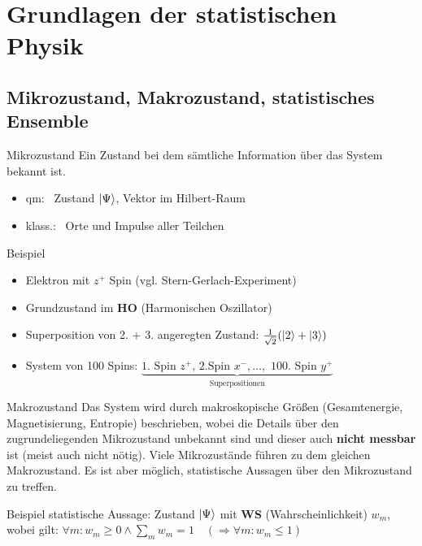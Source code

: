 \section{Grundlagen der statistischen Physik}
\subsection{Mikrozustand, Makrozustand, statistisches Ensemble}

\begin{definition}{Mikrozustand}
    Ein Zustand bei dem sämtliche Information über das System bekannt ist.
    \begin{itemize}
        \item qm: \ Zustand $\ket{\Psi}$, Vektor im Hilbert-Raum 
        \item klass.: \ Orte und Impulse aller Teilchen 
    \end{itemize}
\end{definition}

\begin{beispiel}{Beispiel}
    \begin{itemize}
    \item Elektron mit $z^+$ Spin (vgl. Stern-Gerlach-Experiment)
    \item Grundzustand im \textbf{HO} (Harmonischen Oszillator)
    \item Superposition von 2. + 3. angeregten Zustand: $ \frac{1}{\sqrt{2}}(\ket{2} + \ket{3})$
    \item System von 100 Spins: $\underbrace{\text{1. Spin } z^+\text{, 2.Spin } x^-, \dots, \text{ 100. Spin } y^+}_{\text{Superpositionen}}$
 \end{itemize}
\end{beispiel}



\begin{definition}{Makrozustand}
    Das System wird durch makroskopische Größen (Gesamtenergie, Magnetisierung, Entropie) beschrieben, wobei die Details über den zugrundeliegenden Mikrozustand unbekannt sind und dieser auch \textbf{nicht messbar} ist (meist auch nicht nötig). Viele Mikrozustände führen zu dem gleichen Makrozustand. Es ist aber möglich, statistische Aussagen über den Mikrozustand zu treffen.
\end{definition}

\begin{beispiel}{Beispiel statistische Aussage:}
Zustand $\ket{\Psi}$ mit \textbf{WS} (Wahrscheinlichkeit) $w_m$, wobei gilt: $\forall m: w_m \geq 0 \wedge \sum_m w_m = 1 \quad (\Rightarrow \forall m: w_m \leq 1)$
\end{beispiel}
 
